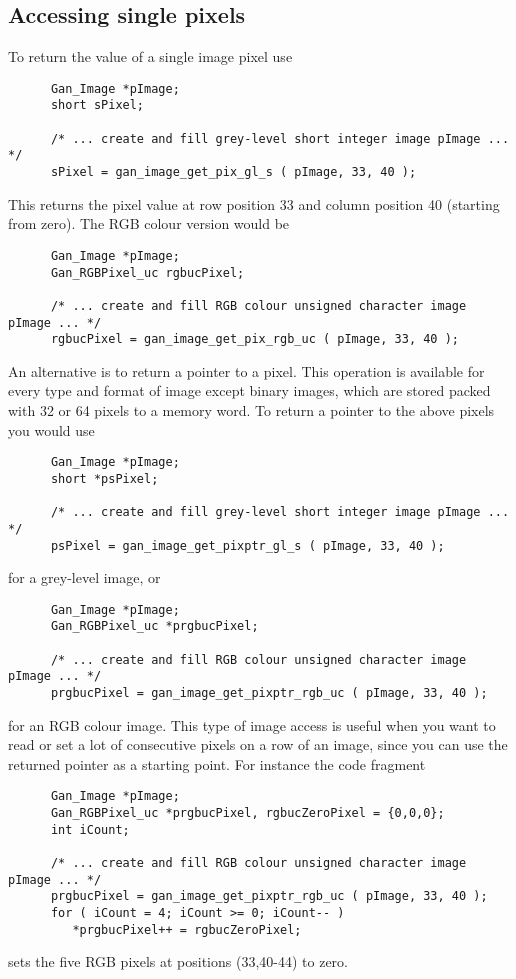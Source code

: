 \subsection{Accessing single pixels}
To return the value of a single image pixel use
\begin{verbatim}
      Gan_Image *pImage;
      short sPixel;

      /* ... create and fill grey-level short integer image pImage ... */
      sPixel = gan_image_get_pix_gl_s ( pImage, 33, 40 );
\end{verbatim}
This returns the pixel value at row position 33 and column position 40
(starting from zero). The RGB colour version would be
\begin{verbatim}
      Gan_Image *pImage;
      Gan_RGBPixel_uc rgbucPixel;

      /* ... create and fill RGB colour unsigned character image pImage ... */
      rgbucPixel = gan_image_get_pix_rgb_uc ( pImage, 33, 40 );
\end{verbatim}

An alternative is to return a pointer to a pixel. This operation is available
for every type and format of image except binary images, which are stored
packed with 32 or 64 pixels to a memory word. To return a pointer to the
above pixels you would use
\begin{verbatim}
      Gan_Image *pImage;
      short *psPixel;

      /* ... create and fill grey-level short integer image pImage ... */
      psPixel = gan_image_get_pixptr_gl_s ( pImage, 33, 40 );
\end{verbatim}
for a grey-level image, or
\begin{verbatim}
      Gan_Image *pImage;
      Gan_RGBPixel_uc *prgbucPixel;

      /* ... create and fill RGB colour unsigned character image pImage ... */
      prgbucPixel = gan_image_get_pixptr_rgb_uc ( pImage, 33, 40 );
\end{verbatim}
for an RGB colour image. This type of image access is useful when you want
to read or set a lot of consecutive pixels on a row of an image, since you
can use the returned pointer as a starting point. For instance the code
fragment
\begin{verbatim}
      Gan_Image *pImage;
      Gan_RGBPixel_uc *prgbucPixel, rgbucZeroPixel = {0,0,0};
      int iCount;

      /* ... create and fill RGB colour unsigned character image pImage ... */
      prgbucPixel = gan_image_get_pixptr_rgb_uc ( pImage, 33, 40 );
      for ( iCount = 4; iCount >= 0; iCount-- )
         *prgbucPixel++ = rgbucZeroPixel;
\end{verbatim}
sets the five RGB pixels at positions (33,40-44) to zero.

